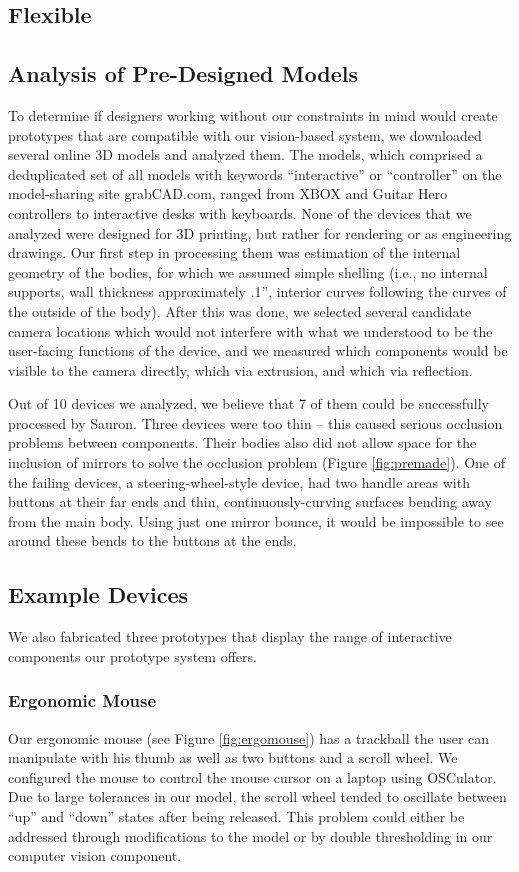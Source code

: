     \subsection{Flexible}
    
    \subsection{Analysis of Pre-Designed Models}
To determine if designers working without our constraints in mind would create prototypes that are compatible with our vision-based system, we downloaded several online 3D models and analyzed them. The models, which comprised a deduplicated set of all models with keywords ``interactive'' or ``controller'' on the model-sharing site grabCAD.com, ranged from XBOX and Guitar Hero controllers to interactive desks with keyboards. None of the devices that we analyzed were designed for 3D printing, but rather for rendering or as engineering drawings.   Our first step in processing them was estimation of the internal geometry of the bodies, for which we assumed simple shelling (i.e., no internal supports, wall thickness approximately .1'', interior curves following the curves of the outside of the body).  After this was done, we selected several candidate camera locations which would not interfere with what we understood to be the user-facing functions of the device, and we measured which components would be visible to the camera directly, which via extrusion, and which via reflection. 

Out of 10 devices we analyzed, we believe that 7 of them could be successfully processed by Sauron. Three devices were too thin -- this caused serious occlusion problems between components.  Their bodies also did not allow space for the inclusion of mirrors to solve the occlusion problem (Figure \ref{fig:premade}).  One of the failing devices, a steering-wheel-style device, had two handle areas with buttons at their far ends and thin, continuously-curving surfaces bending away from the main body. Using just one mirror bounce, it would be impossible to see around these bends to the buttons at the ends.


\subsection{Example Devices}
We also fabricated three prototypes that display the range of interactive components our prototype system offers.

\subsubsection{Ergonomic Mouse}
Our ergonomic mouse (see Figure \ref{fig:ergomouse}) has a trackball the user can manipulate with his thumb as well as two buttons and a scroll wheel.  We configured the mouse to control the mouse cursor on a laptop using OSCulator.  Due to large tolerances in our model, the scroll wheel tended to oscillate between ``up'' and ``down'' states after being released. This problem could either be addressed through modifications to the model or by double thresholding in our computer vision component.



